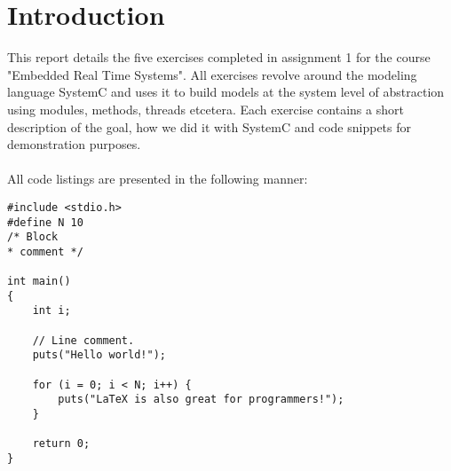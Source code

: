 \section{Introduction}

This report details the five exercises completed in assignment 1 for the course "Embedded Real Time Systems". All exercises revolve around the modeling language SystemC and uses it to build models at the system level of abstraction using modules, methods, threads etcetera. Each exercise contains a short description of the goal, how we did it with SystemC and code snippets for demonstration purposes. \\\\
All code listings are presented in the following manner:
\begin{lstlisting}[style=customc++, caption=Example listing.]
#include <stdio.h>
#define N 10
/* Block
* comment */

int main()
{
	int i;

	// Line comment.
	puts("Hello world!");

	for (i = 0; i < N; i++) {
		puts("LaTeX is also great for programmers!");
	}

	return 0;
}
\end{lstlisting}